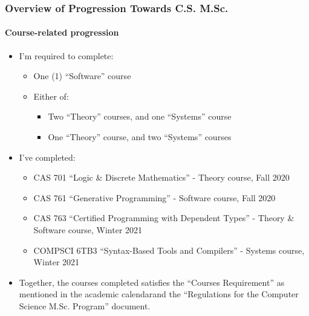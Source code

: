 \documentclass{beamer}
\begin{document}
\begin{frame}
    \frametitle{Overview of Progression Towards C.S. M.Sc.}
    \framesubtitle{Course-related progression}
    \begin{itemize}
        \item<1-> I'm required to complete\footnotemark[1]\footnotemark[2]:
            \begin{itemize}
                \item<2-> One (1) ``Software'' course
                \item<3-> Either of:
                    \begin{itemize}
                        \item<4-> Two ``Theory'' courses, and one ``Systems'' course
                        \item<4-> One ``Theory'' course, and two ``Systems'' courses
                    \end{itemize}
            \end{itemize}
        \item<5-> I've completed:
            \begin{itemize}
                \item<6-> CAS 701 ``Logic \& Discrete Mathematics'' - Theory course, Fall 2020
                \item<7-> CAS 761 ``Generative Programming'' - Software course, Fall 2020
                \item<8-> CAS 763 ``Certified Programming with Dependent Types'' - Theory \& Software course, Winter 2021
                \item<9-> COMPSCI 6TB3 ``Syntax-Based Tools and Compilers'' - Systems course, Winter 2021
            \end{itemize}
        \item<10-> Together, the courses completed satisfies the ``Courses Requirement'' as mentioned in the academic calendar\footnotemark[1] and the ``Regulations for the Computer Science M.Sc. Program'' document\footnotemark[2].
    \end{itemize}

\end{frame}
\end{document}
